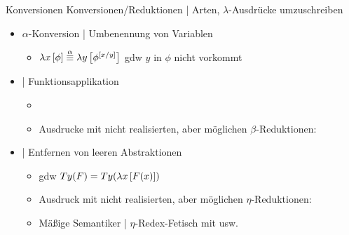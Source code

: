 \begin{frame}
  {Konversionen}
  \onslide<+->
  \onslide<+->
  \alert{Konversionen\slash Reduktionen} | Arten, $\lambda$-Ausdrücke umzuschreiben\\
  \Halbzeile
  \begin{itemize}[<+->]
    \item \alert{$\alpha$-Konversion} | Umbenennung von Variablen
      \begin{itemize}[<+->]
        \item \alert{$\lambda x\left[{}\phi\right]\stackrel{\alpha}{\equiv}\lambda y\left[{}\phi^{\left[{}x/y\right]}\right]$} gdw $y$ in $\phi$ nicht vorkommt
      \end{itemize}
      \Halbzeile
    \item {} | Funktionsapplikation
      \begin{itemize}[<+->]
        \item {}
        \item Ausdrucke mit nicht realisierten, aber möglichen $\beta$-Reduktionen: 
      \end{itemize}
      \Halbzeile
    \item {} | Entfernen von leeren Abstraktionen
      \begin{itemize}[<+->]
        \item {} gdw $Ty(F)=Ty(\lambda x\left[{}F(x)\right])$ 
        \item Ausdruck mit nicht realisierten, aber möglichen $\eta$-Reduktionen: 
        \item Mäßige Semantiker | $\eta$-Redex-Fetisch mit  usw.
      \end{itemize}
  \end{itemize}
\end{frame}

